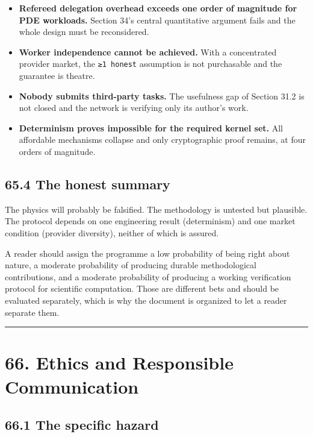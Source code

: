 \documentclass[
  11pt]{report}
\providecommand{\tightlist}{%
  \setlength{\itemsep}{0pt}\setlength{\parskip}{0pt}}
\begin{document}
\begin{itemize}
\tightlist
\item
  \textbf{Refereed delegation overhead exceeds one order of magnitude
  for PDE workloads.} Section 34's central quantitative argument fails
  and the whole design must be reconsidered.
\item
  \textbf{Worker independence cannot be achieved.} With a concentrated
  provider market, the \texttt{≥1\ honest} assumption is not purchasable
  and the guarantee is theatre.
\item
  \textbf{Nobody submits third-party tasks.} The usefulness gap of
  Section 31.2 is not closed and the network is verifying only its
  author's work.
\item
  \textbf{Determinism proves impossible for the required kernel set.}
  All affordable mechanisms collapse and only cryptographic proof
  remains, at four orders of magnitude.
\end{itemize}

\hypertarget{the-honest-summary}{%
\section{65.4 The honest summary}\label{the-honest-summary}}

The physics will probably be falsified. The methodology is untested but
plausible. The protocol depends on one engineering result (determinism)
and one market condition (provider diversity), neither of which is
assured.

A reader should assign the programme a low probability of being right
about nature, a moderate probability of producing durable methodological
contributions, and a moderate probability of producing a working
verification protocol for scientific computation. Those are different
bets and should be evaluated separately, which is why the document is
organized to let a reader separate them.

\begin{center}\rule{0.5\linewidth}{0.5pt}\end{center}

\hypertarget{ethics-and-responsible-communication}{%
\chapter{66. Ethics and Responsible
Communication}\label{ethics-and-responsible-communication}}

\hypertarget{the-specific-hazard}{%
\section{66.1 The specific hazard}\label{the-specific-hazard}}
\end{document}
